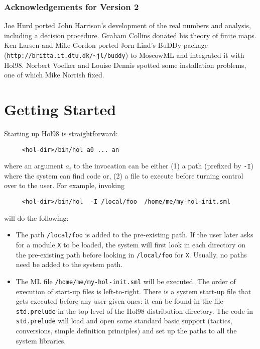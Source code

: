 \documentclass[12pt,fleqn,a4paper]{report}
\begin{document}
\subsection*{Acknowledgements for Version 2}

Joe Hurd ported John Harrison's development of the real numbers and
analysis, including a decision procedure. Graham Collins donated his
theory of finite maps. Ken Larsen and Mike Gordon ported Jorn Lind's
BuDDy package (\verb+http://britta.it.dtu.dk/~jl/buddy+) to MoscowML and
integrated it with Hol98. Norbert Voelker and Louise Dennis spotted some
installation problems, one of which Mike Norrish fixed.


\tableofcontents

\chapter{Getting Started}

 Starting up Hol98 is straightforward:
 \begin{verbatim}
     <hol-dir>/bin/hol a0 ... an
 \end{verbatim}
 where an argument $a_i$ to the invocation can be either (1) a path
 (prefixed by \verb+-I+) where the system can find code or, (2) a file to
 execute before turning control over to the user. For example, invoking
 \begin{verbatim}
     <hol-dir>/bin/hol  -I /local/foo  /home/me/my-hol-init.sml
 \end{verbatim}
 will do the following:
 \begin{itemize}
 \item The path \verb+/local/foo+ is added to the pre-existing path. If
    the user later asks for a module \verb+X+ to be loaded, the system
    will first look in each directory on the pre-existing path before
    looking in \verb+/local/foo+ for \verb+X+. Usually, no paths need be
    added to the system path.

 \item The ML file \verb+/home/me/my-hol-init.sml+ will be executed. The
      order of execution of start-up files is left-to-right. There is a
      system start-up file that gets executed before any user-given ones:
      it can be found in the file \verb+std.prelude+ in the top level of the
      Hol98 distribution directory. The code in \verb+std.prelude+ will
      load and open some standard basic support (tactics, conversions,
      simple definition principles) and set up the paths to all the
      system libraries.
 \end{itemize}
\end{document}
